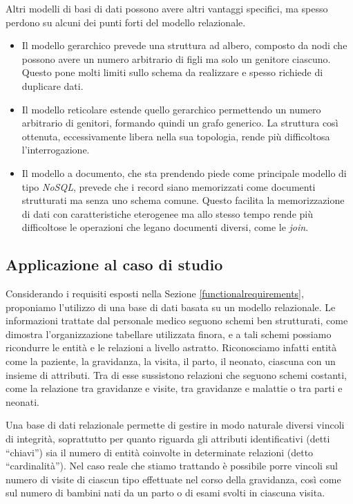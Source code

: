 Altri modelli di basi di dati possono avere altri vantaggi specifici, ma spesso perdono su alcuni dei punti forti del modello relazionale.
\begin{itemize}
\item Il modello gerarchico prevede una struttura ad albero, composto da nodi che possono avere un numero arbitrario di figli ma solo un genitore ciascuno. Questo pone molti limiti sullo schema da realizzare e spesso richiede di duplicare dati.
\item Il modello reticolare estende quello gerarchico permettendo un numero arbitrario di genitori, formando quindi un grafo generico. La struttura così ottenuta, eccessivamente libera nella sua topologia, rende più difficoltosa l'interrogazione.
\item Il modello a documento, che sta prendendo piede come principale modello di tipo \emph{NoSQL}, prevede che i record siano memorizzati come documenti strutturati ma senza uno schema comune. Questo facilita la memorizzazione di dati con caratteristiche eterogenee ma allo stesso tempo rende più difficoltose le operazioni che legano documenti diversi, come le \emph{join}.
\end{itemize}

\subsection{Applicazione al caso di studio}

Considerando i requisiti esposti nella Sezione \ref{functionalrequirements}, proponiamo l'utilizzo di una base di dati basata su un modello relazionale.
Le informazioni trattate dal personale medico seguono schemi ben strutturati, come dimostra l'organizzazione tabellare utilizzata finora, e a tali schemi possiamo ricondurre le entità e le relazioni a livello astratto.
Riconosciamo infatti entità come la paziente, la gravidanza, la visita, il parto, il neonato, ciascuna con un insieme di attributi.
Tra di esse sussistono relazioni che seguono schemi costanti, come la relazione tra gravidanze e visite, tra gravidanze e malattie o tra parti e neonati.

Una base di dati relazionale permette di gestire in modo naturale diversi vincoli di integrità, soprattutto per quanto riguarda gli attributi identificativi (detti \enquote{chiavi}) sia il numero di entità coinvolte in determinate relazioni (detto \enquote{cardinalità}).
Nel caso reale che stiamo trattando è possibile porre vincoli sul numero di visite di ciascun tipo effettuate nel corso della gravidanza, così come sul numero di bambini nati da un parto o di esami svolti in ciascuna visita.

